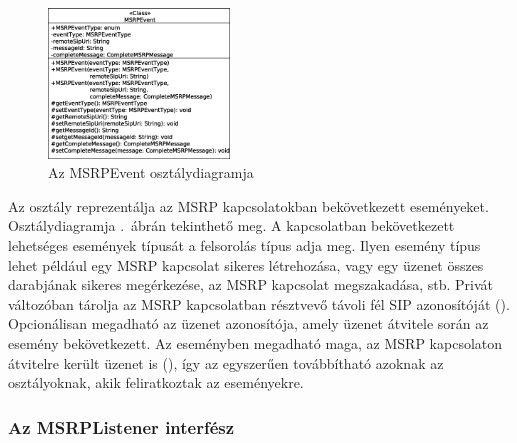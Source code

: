 \begin{figure}
  \vspace{-15pt}
  \begin{center}
    \includegraphics[width=0.43\textwidth]{img/class_diagrams/MSRPEvent.eps}
  \end{center}
  \vspace{-15pt}
  \captionsetup{font=scriptsize}
  \caption{Az MSRPEvent osztálydiagramja}
   \label{fig:class_event}
  \vspace{-10pt}
\end{figure}
Az  osztály reprezentálja az MSRP kapcsolatokban bekövetkezett eseményeket. Osztálydiagramja .~ábrán tekinthető meg. A kapcsolatban bekövetkezett lehetséges események típusát a  felsorolás típus adja meg. Ilyen esemény típus lehet például egy MSRP kapcsolat sikeres létrehozása, vagy egy üzenet összes darabjának sikeres megérkezése, az MSRP kapcsolat megszakadása, stb. Privát változóban tárolja az MSRP kapcsolatban résztvevő távoli fél SIP azonosítóját (). Opcionálisan megadható az üzenet azonosítója, amely üzenet átvitele során az esemény bekövetkezett. Az eseményben megadható maga, az MSRP kapcsolaton átvitelre került üzenet is (), így az egyszerűen továbbítható azoknak az osztályoknak, akik feliratkoztak az eseményekre.

\subsubsection*{Az MSRPListener interfész}
\label{sec:msrp_listener}


